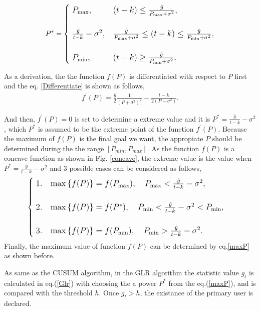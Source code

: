 \begin{align}
{\large
P^{*}=
\begin{cases}
\;P_{{\rm max}}, & (t-k)\leq\frac{\hat{y}}{P_{{\rm max}}+\sigma^2}, \\
\; \\ 
\;\frac{\hat{y}}{t-k}-\sigma^2, & \frac{\hat{y}}{P_{{\rm max}}+\sigma^2}\leq(t-k)\leq\frac{\hat{y}}{P_{{\rm min}}+\sigma^2}, \label{maxP} \\ 
\; \\
\; P_{{\rm min}}, & (t-k) \geq \frac{\hat{y}}{P_{{\rm min}}+\sigma^2}.
\end{cases}
}
\end{align}

As a derivation, the the function $f(P)$ is differentiated with respect to $P$ first and the eq. \ref{Differentiate} is shown as follows,
\begin{eqnarray}
f^{'}(P)=\frac{\hat{y}}{2}\frac{1}{(P+\sigma^2)^2}-\frac{t-k}{2(P+\sigma^2)}.
\label{Differentiate}
\end{eqnarray}

And then, $f^{'}(P)=0$ is set to determine a extreme value and it is $P^{*}=\frac{\hat{y}}{t-k}-\sigma^2$, which $P^{*}$ is assumed to be the extreme point of the function  $f^{'}(P)$. Because the maximum of ${f(P)}$ is the final goal we want, the appropiate $P$ should be determined during the the range $[P_{min},P_{max}]$. As the function $f(P)$ is a concave function as shown in Fig. \ref{concave}, the extreme value is the value when  $P^{*}=\frac{\hat{y}}{t-k}-\sigma^2$ and 3 possible cases can be considered as follows,
\begin{eqnarray}
{\large
\begin{cases}
\;1. \ \ \ {\rm max}\left\{f(P)\right\}=f(P_{{\rm max}}), \ \ \ P_{{\rm max}}<\frac{\hat{y}}{t-k}-\sigma^2, \\
\;\\
\;2. \ \ \ {\rm max}\left\{f(P)\right\}=f(P^{*}), \ \ \ P_{{\rm min}}<\frac{\hat{y}}{t-k}-\sigma^2<P_{{\rm min}},\\
\;\\
\;3. \ \ \ {\rm max}\left\{f(P)\right\}=f(P_{{\rm min}}), \ \ \ P_{{\rm min}}>\frac{\hat{y}}{t-k}-\sigma^2.
\end{cases}
}
\end{eqnarray}
Finally, the maximum value of function $f(P)$ can be determined by eq.\ref{maxP} as shown before.

As same as the CUSUM algorithm, in the GLR algorithm the statistic value $g_t$ is calculated in eq.(\ref{Glr}) with choosing the a power $P^{*}$ from the eq.(\ref{maxP}), and is compared with the threshold $h$. Once $g_t>h$, the existance of the primary user is declared.

